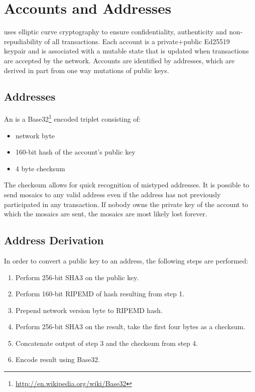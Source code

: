 \section{Accounts and Addresses}
\label{sec:accounts}


\codenamechapterfirstword uses elliptic curve cryptography to ensure confidentiality, authenticity and non-repudiability of all transactions.
Each account is a private+public Ed25519 keypair  and is associated with a mutable state that is updated when transactions are accepted by the network.
Accounts are identified by addresses, which are derived in part from one way mutations of public keys.

\subsection{Addresses}

An  is a Base32\footnote{ \url{http://en.wikipedia.org/wiki/Base32} } encoded triplet consisting of:
\begin{itemize}
	\item{network byte}
	\item{160-bit hash of the account's public key}
	\item{4 byte checksum}
\end{itemize}

The checksum allows for quick recognition of mistyped addresses.
It is possible to send mosaics to any valid address even if the address has not previously participated in any transaction.
If nobody owns the private key of the account to which the mosaics are sent, the mosaics are most likely lost forever.

\subsection{Address Derivation}
In order to convert a public key to an address, the following steps are performed:
\begin{enumerate}
	\item{Perform 256-bit SHA3 on the public key.}
	\item{Perform 160-bit RIPEMD of hash resulting from step 1.}
	\item{Prepend network version byte to RIPEMD hash.}
	\item{Perform 256-bit SHA3 on the result, take the first four bytes as a checksum.}
	\item{Concatenate output of step 3 and the checksum from step 4.}
	\item{Encode result using Base32.}
\end{enumerate}

